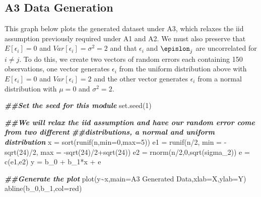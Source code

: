 \documentclass[
]{article}
\newenvironment{Shaded}{\begin{snugshade}}{\end{snugshade}}
\newcommand{\AttributeTok}[1]{\textcolor[rgb]{0.77,0.63,0.00}{#1}}
\newcommand{\DecValTok}[1]{\textcolor[rgb]{0.00,0.00,0.81}{#1}}
\newcommand{\DocumentationTok}[1]{\textcolor[rgb]{0.56,0.35,0.01}{\textbf{\textit{#1}}}}
\newcommand{\FunctionTok}[1]{\textcolor[rgb]{0.00,0.00,0.00}{#1}}
\newcommand{\NormalTok}[1]{#1}
\newcommand{\OtherTok}[1]{\textcolor[rgb]{0.56,0.35,0.01}{#1}}
\newcommand{\SpecialCharTok}[1]{\textcolor[rgb]{0.00,0.00,0.00}{#1}}
\newcommand{\StringTok}[1]{\textcolor[rgb]{0.31,0.60,0.02}{#1}}
\begin{document}
\hypertarget{a3-data-generation}{%
\subsection{A3 Data Generation}\label{a3-data-generation}}

This graph below plots the generated dataset under A3, which relaxes the
iid assumption previously required under A1 and A2. We must also
preserve that \(E[\epsilon_i]=0\) and \(Var[\epsilon_i]=\sigma^2=2\) and
that \(\epsilon_i\) and \(\epislon_j\) are uncorrelated for
\(i \neq j\). To do this, we create two vectors of random errors each
containing 150 observations, one vector generates \(\epsilon_i\) from
the uniform distribution above with \(E[\epsilon_i]=0\) and
\(Var[\epsilon_i]=2\) and the other vector generates \(\epsilon_i\) from
a normal distribution with \(\mu=0\) and \(\sigma^2=2\).

\begin{Shaded}
\begin{Highlighting}[]
\DocumentationTok{\#\#Set the seed for this module}
\FunctionTok{set.seed}\NormalTok{(}\DecValTok{1}\NormalTok{)}

\DocumentationTok{\#\#We will relax the iid assumption and have our random error come from two different}
\DocumentationTok{\#\#distributions, a normal and uniform distribution}
\NormalTok{x }\OtherTok{=} \FunctionTok{sort}\NormalTok{(}\FunctionTok{runif}\NormalTok{(n,}\AttributeTok{min=}\DecValTok{0}\NormalTok{,}\AttributeTok{max=}\DecValTok{5}\NormalTok{))}
\NormalTok{e1 }\OtherTok{=} \FunctionTok{runif}\NormalTok{(n}\SpecialCharTok{/}\DecValTok{2}\NormalTok{, }\AttributeTok{min =} \SpecialCharTok{{-}}\FunctionTok{sqrt}\NormalTok{(}\DecValTok{24}\NormalTok{)}\SpecialCharTok{/}\DecValTok{2}\NormalTok{, }\AttributeTok{max =} \SpecialCharTok{{-}}\FunctionTok{sqrt}\NormalTok{(}\DecValTok{24}\NormalTok{)}\SpecialCharTok{/}\DecValTok{2}\SpecialCharTok{+}\FunctionTok{sqrt}\NormalTok{(}\DecValTok{24}\NormalTok{))}
\NormalTok{e2 }\OtherTok{=} \FunctionTok{rnorm}\NormalTok{(n}\SpecialCharTok{/}\DecValTok{2}\NormalTok{,}\DecValTok{0}\NormalTok{,}\FunctionTok{sqrt}\NormalTok{(sigma\_2))}
\NormalTok{e }\OtherTok{=} \FunctionTok{c}\NormalTok{(e1,e2)}
\NormalTok{y }\OtherTok{=}\NormalTok{ b\_0 }\SpecialCharTok{+}\NormalTok{ b\_1}\SpecialCharTok{*}\NormalTok{x }\SpecialCharTok{+}\NormalTok{ e}

\DocumentationTok{\#\#Generate the plot}
\FunctionTok{plot}\NormalTok{(y}\SpecialCharTok{\textasciitilde{}}\NormalTok{x,}\AttributeTok{main=}\StringTok{\textquotesingle{}A3 Generated Data\textquotesingle{}}\NormalTok{,}\AttributeTok{xlab=}\StringTok{\textquotesingle{}X\textquotesingle{}}\NormalTok{,}\AttributeTok{ylab=}\StringTok{\textquotesingle{}Y\textquotesingle{}}\NormalTok{)}
\FunctionTok{abline}\NormalTok{(b\_0,b\_1,}\AttributeTok{col=}\StringTok{\textquotesingle{}red\textquotesingle{}}\NormalTok{)}
\end{Highlighting}
\end{Shaded}
\end{document}
